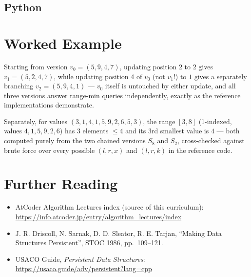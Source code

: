 \documentclass[11pt]{article}
\begin{document}
\subsection{Python}

\section{Worked Example}
\begin{examplebox}
Starting from version $v_0 = (5,9,4,7)$, updating position $2$ to $2$
gives $v_1 = (5,2,4,7)$, while updating position $4$ of $v_0$ (not $v_1$!)
to $1$ gives a separately branching $v_2 = (5,9,4,1)$ --- $v_0$ itself is
untouched by either update, and all three versions answer range-min
queries independently, exactly as the reference implementations
demonstrate.

Separately, for values $(3,1,4,1,5,9,2,6,5,3)$, the range $[3,8]$
(1-indexed, values $4,1,5,9,2,6$) has $3$ elements $\le 4$ and its $3$rd
smallest value is $4$ --- both computed purely from the two chained
versions $S_8$ and $S_2$, cross-checked against brute force over every
possible $(l, r, x)$ and $(l, r, k)$ in the reference code.
\end{examplebox}

\section{Further Reading}
\begin{itemize}[leftmargin=1.5em]
  \item AtCoder Algorithm Lectures index (source of this curriculum):
        \url{https://info.atcoder.jp/entry/algorithm_lectures/index}
  \item J. R. Driscoll, N. Sarnak, D. D. Sleator, R. E. Tarjan, ``Making
        Data Structures Persistent'', STOC 1986, pp.\ 109--121.
  \item USACO Guide, \emph{Persistent Data Structures}:
        \url{https://usaco.guide/adv/persistent?lang=cpp}
\end{itemize}
\end{document}
